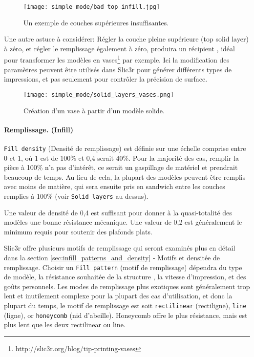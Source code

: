 \begin{figure}[H]
\centering
\texttt{[image: simple\_mode/bad\_top\_infill.jpg]}
\caption{Un exemple de couches sup\'erieures insuffisantes.}
\label{fig:bad_top_infill}
\end{figure}

Une autre astuce \`a consid\'erer: R\'egler la couche pleine sup\'erieure (top solid layer) \`a z\'ero, et r\'egler le remplissage \'egalement \`a z\'ero, produira un r\'ecipient , id\'eal pour transformer les mod\`eles en vases\footnote{http://slic3r.org/blog/tip-printing-vases} par exemple. Ici la modification des param\`etres peuvent \^etre utilis\'es dans Slic3r pour g\'en\'erer diff\'erents types de impressions, et pas seulement pour contr\^oler la pr\'ecision de surface.

\begin{figure}[H]
\centering
\texttt{[image: simple\_mode/solid\_layers\_vases.png]}
\caption{Cr\'eation d'un vase \`a partir d'un mod\`ele solide.}
\label{fig:solid_layers_vases}
\end{figure}


\paragraph{Remplissage. (Infill)} %
\label{par:simple_infill}
\texttt{Fill density} (Densit\'e de remplissage) est d\'efinie sur une \'echelle comprise entre 0 et 1, o\`u 1 est de 100\% et 0,4 serait 40\%. Pour la majorit\'e des cas, remplir la pi\`ece \`a 100\% n'a pas d'int\'er\^et, ce serait un gaspillage de mat\'eriel et prendrait beaucoup de temps. Au lieu de cela, la plupart des mod\`eles peuvent \^etre remplis avec moins de mati\`ere, qui sera ensuite pris en sandwich entre les couches remplies \`a 100\% (voir \texttt{Solid layers} au dessus).

Une valeur de densit\'e de 0,4 est suffisant pour donner \`a la quasi-totalit\'e des mod\`eles une bonne r\'esistance m\'ecanique. Une valeur de 0,2 est g\'en\'eralement le minimum requis pour soutenir des plafonds plats.

Slic3r offre plusieurs motifs de remplissage qui seront examin\'es plus en d\'etail dans la section \ref{sec:infill_patterns_and_density} - Motifs et densit\'ee de remplissage.  Choisir un \texttt{Fill pattern} (motif de remplissage) d\'ependra du type de mod\`ele, la r\'esistance souhait\'ee de la structure , la vitesse d'impression, et des go\^uts personnels. Les modes de remplissage plus exotiques sont g\'en\'eralement trop lent et inutilement complexe pour la plupart des cas d'utilisation, et donc la plupart du temps, le motif de remplissage est soit \texttt{rectilinear} (rectiligne), \texttt{line} (ligne), or \texttt{honeycomb} (nid d'abeille).  Honeycomb offre le plus r\'esistance, mais est plus lent que les deux rectilinear ou line.

